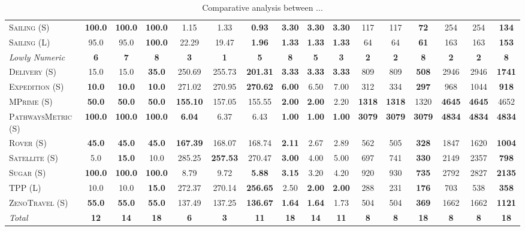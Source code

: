 \documentclass[11pt,landscape]{article}
\begin{document}
\begin{table*}[tb]
{\begin{tabular}{|l||ccc||ccc||ccc||ccc||ccc||}
\textsc{Sailing} (S)&\textbf{100.0}&\textbf{100.0}&\textbf{100.0}&1.15&1.33&\textbf{0.93}&\textbf{3.30}&\textbf{3.30}&\textbf{3.30}&117&117&\textbf{72}&254&254&\textbf{134}\\
\textsc{Sailing} (L)&95.0&95.0&\textbf{100.0}&22.29&19.47&\textbf{1.96}&\textbf{1.33}&\textbf{1.33}&\textbf{1.33}&64&64&\textbf{61}&163&163&\textbf{153}
\\\hline
\textit{Lowly Numeric}&\textbf{6}&\textbf{7}&\textbf{8}&\textbf{3}&\textbf{1}&\textbf{5}&\textbf{8}&\textbf{5}&\textbf{3}&\textbf{2}&\textbf{2}&\textbf{8}&\textbf{2}&\textbf{2}&\textbf{8}\\\hline
\textsc{Delivery} (S)&15.0&15.0&\textbf{35.0}&250.69&255.73&\textbf{201.31}&\textbf{3.33}&\textbf{3.33}&\textbf{3.33}&809&809&\textbf{508}&2946&2946&\textbf{1741}\\
\textsc{Expedition} (S)&\textbf{10.0}&\textbf{10.0}&\textbf{10.0}&271.02&270.95&\textbf{270.62}&\textbf{6.00}&6.50&7.00&312&334&\textbf{297}&968&1044&\textbf{918}\\
\textsc{MPrime} (S)&\textbf{50.0}&\textbf{50.0}&\textbf{50.0}&\textbf{155.10}&157.05&155.55&\textbf{2.00}&\textbf{2.00}&2.20&\textbf{1318}&\textbf{1318}&1320&\textbf{4645}&\textbf{4645}&4652\\
\textsc{PathwaysMetric} (S)&\textbf{100.0}&\textbf{100.0}&\textbf{100.0}&\textbf{6.04}&6.37&6.43&\textbf{1.00}&\textbf{1.00}&\textbf{1.00}&\textbf{3079}&\textbf{3079}&\textbf{3079}&\textbf{4834}&\textbf{4834}&\textbf{4834}\\
\textsc{Rover} (S)&\textbf{45.0}&\textbf{45.0}&\textbf{45.0}&\textbf{167.39}&168.07&168.74&\textbf{2.11}&2.67&2.89&562&505&\textbf{328}&1847&1620&\textbf{1004}\\
\textsc{Satellite} (S)&5.0&\textbf{15.0}&10.0&285.25&\textbf{257.53}&270.47&\textbf{3.00}&4.00&5.00&697&741&\textbf{330}&2149&2357&\textbf{798}\\
\textsc{Sugar} (S)&\textbf{100.0}&\textbf{100.0}&\textbf{100.0}&8.79&9.72&\textbf{5.88}&\textbf{3.15}&3.20&4.20&920&930&\textbf{735}&2792&2827&\textbf{2135}\\
\textsc{TPP} (L)&10.0&10.0&\textbf{15.0}&272.37&270.14&\textbf{256.65}&2.50&\textbf{2.00}&\textbf{2.00}&288&231&\textbf{176}&703&538&\textbf{358}\\
\textsc{ZenoTravel} (S)&\textbf{55.0}&\textbf{55.0}&\textbf{55.0}&137.49&137.25&\textbf{136.67}&\textbf{1.64}&\textbf{1.64}&1.73&504&504&\textbf{369}&1662&1662&\textbf{1121}
\\\hline
\textit{Total}&\textbf{12}&\textbf{14}&\textbf{18}&\textbf{6}&\textbf{3}&\textbf{11}&\textbf{18}&\textbf{14}&\textbf{11}&\textbf{8}&\textbf{8}&\textbf{18}&\textbf{8}&\textbf{8}&\textbf{18}\\\hline

        \end{tabular}}
        \caption{Comparative analysis between ...}
        \label{tab:experiments}
        \end{table*}
        
\end{document}
